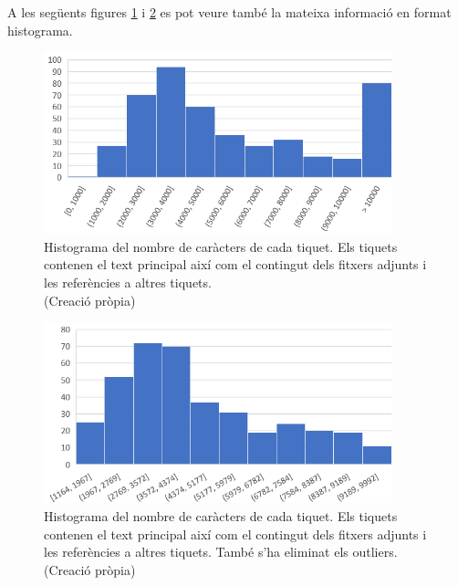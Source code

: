 A les següents figures \ref{fig:histograma_num_chars_adj_refs} i \ref{fig:histograma_num_chars_adj_refs_outliers} es pot veure també la mateixa informació en format histograma.

\begin{figure}[H]
    \centering
    \includegraphics[width=0.9\textwidth]{histograma_num_chars_adj_refs.png}
    \caption[Histograma dels caràcters de cada tiquet amb adjunts i referències]{Histograma del nombre de caràcters de cada tiquet. Els tiquets contenen el text principal així com el contingut dels fitxers adjunts i les referències a altres tiquets. \\ (Creació pròpia)}
    \label{fig:histograma_num_chars_adj_refs}
\end{figure}

 
\begin{figure}[H]
    \centering
    \includegraphics[width=0.9\textwidth]{histograma_num_chars_adj_refs_outliers.png}
    \caption[Histograma dels caràcters de cada tiquet amb adjunts i referències i sense outliers]{Histograma del nombre de caràcters de cada tiquet. Els tiquets contenen el text principal així com el contingut dels fitxers adjunts i les referències a altres tiquets. També s'ha eliminat els outliers. \\ (Creació pròpia)}
    \label{fig:histograma_num_chars_adj_refs_outliers}
\end{figure}


